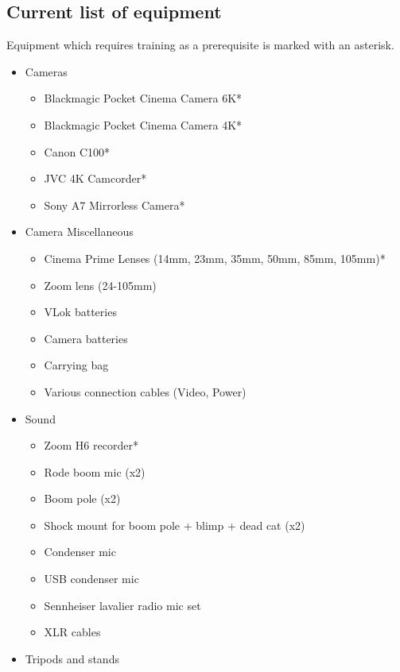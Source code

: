 \documentclass[]{article}
\begin{document}
\subsection{Current list of equipment}
Equipment which requires training as a prerequisite is marked with an asterisk.
\begin{itemize}
    \item Cameras
          \begin{itemize}
              \item Blackmagic Pocket Cinema Camera 6K*
              \item Blackmagic Pocket Cinema Camera 4K*
              \item Canon C100*
              \item JVC 4K Camcorder*
              \item Sony A7 Mirrorless Camera*
          \end{itemize}
    \item Camera Miscellaneous
          \begin{itemize}
              \item Cinema Prime Lenses (14mm, 23mm, 35mm, 50mm, 85mm, 105mm)*
              \item Zoom lens (24-105mm)
              \item VLok batteries
              \item Camera batteries
              \item Carrying bag
              \item Various connection cables (Video, Power)
          \end{itemize}
    \item Sound
          \begin{itemize}
              \item Zoom H6 recorder*
              \item Rode boom mic (x2)
              \item Boom pole (x2)
              \item Shock mount for boom pole + blimp + dead cat (x2)
              \item Condenser mic
              \item USB condenser mic
              \item Sennheiser lavalier radio mic set
              \item XLR cables
          \end{itemize}
    \item Tripods and stands
          \begin{itemize}

\end{itemize}
\end{itemize}
\end{document}

